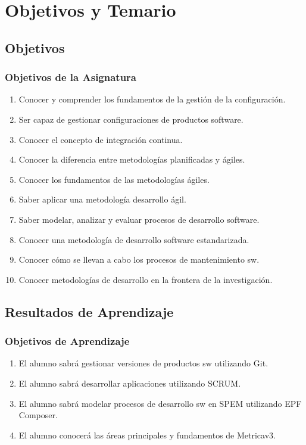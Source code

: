 \documentclass[animated,a4paper,slidestop,xcolor=pst,blue]{beamer}
\begin{document}
\section{Objetivos y Temario}

\subsection{Objetivos}

\begin{frame}[c]
	\frametitle{Objetivos de la Asignatura}
    \begin{enumerate}[<+->]
        \item Conocer y comprender los fundamentos de la gestión de la configuración.
        \item Ser capaz de gestionar configuraciones de productos software.
        \item Conocer el concepto de integración continua.
        \item Conocer la diferencia entre metodologías planificadas y ágiles.
        \item Conocer los fundamentos de las metodologías ágiles.
        \item \alert{Saber aplicar una metodología desarrollo ágil}.
        \item Saber modelar, analizar y evaluar procesos de desarrollo software.
        \item Conocer una metodología de desarrollo software estandarizada.
        \item Conocer cómo se llevan a cabo los procesos de mantenimiento sw.
        \item Conocer metodologías de desarrollo en la frontera de la investigación.
	 \end{enumerate}
\end{frame}

\subsection{Resultados de Aprendizaje}

\begin{frame}[c]
	\frametitle{Objetivos de Aprendizaje}
    	\begin{enumerate}[<+->]
            \item El alumno sabrá gestionar versiones de productos sw utilizando \alert{Git}.
            \item El alumno sabrá desarrollar aplicaciones utilizando \alert{SCRUM}.
            \item El alumno sabrá modelar procesos de desarrollo sw en \alert{SPEM} utilizando \alert{EPF Composer}.
            \item El alumno conocerá las áreas principales y fundamentos de \alert{Metricav3}.
		\end{enumerate}
\end{frame}
\end{document}
